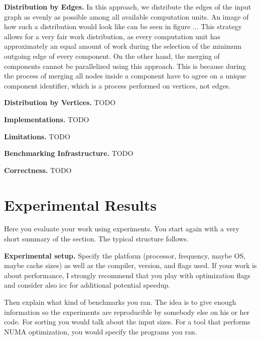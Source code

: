 \documentclass[letterpaper]{article}
\newcommand{\mypar}[1]{{\bf #1.}}
\begin{document}
\mypar{Distribution by Edges}
In this approach, we distribute the edges of the input graph as evenly as possible among all available computation
units. An image of how such a distribution would look like can be seen in figure ... %
This strategy allows for a very fair work distribution, as every computation unit has approximately an equal amount of
work during the selection of the minimum outgoing edge of every component. On the other hand, the merging of components
cannot be parallelized using this approach. This is because during the process of merging all nodes inside a component
have to agree on a unique component identifier, which is a process performed on vertices, not edges.

\mypar{Distribution by Vertices}
TODO

\mypar{Implementations}
TODO

\mypar{Limitations}
TODO

\mypar{Benchmarking Infrastructure}
TODO

\mypar{Correctness}
TODO




\section{Experimental Results}\label{sec:exp}

Here you evaluate your work using experiments. You start again with a
very short summary of the section. The typical structure follows.

\mypar{Experimental setup} Specify the platform (processor, frequency, maybe OS, maybe cache sizes)
as well as the compiler, version, and flags used. If your work is about performance, 
I strongly recommend that you play with optimization flags and consider also icc for additional potential speedup.

Then explain what kind of benchmarks you ran. The idea is to give enough information so the experiments are reproducible by somebody else on his or her code.
For sorting you would talk about the input sizes. For a tool that performs NUMA optimization, you would specify the programs you ran.
\end{document}
